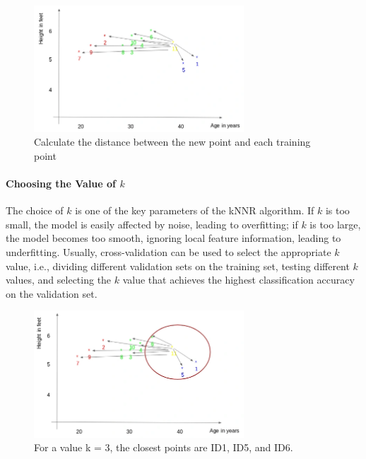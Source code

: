 \documentclass{article}
\begin{document}
\begin{figure}[H]
    \centering
    \includegraphics[width=0.7\textwidth]{Img/Screenshot-from-2018-08-22-12-49-33.png}
    \caption{Calculate the distance between the new point and each training point}
\end{figure}

\paragraph{Choosing the Value of \( k \)}
The choice of \( k \) is one of the key parameters of the kNNR algorithm. If \( k \) is too small, the model is easily affected by noise, leading to overfitting; if \( k \) is too large, the model becomes too smooth, ignoring local feature information, leading to underfitting. Usually, cross-validation can be used to select the appropriate \( k \) value, i.e., dividing different validation sets on the training set, testing different \( k \) values, and selecting the \( k \) value that achieves the highest classification accuracy on the validation set.

\begin{figure}[H]
    \centering
    \includegraphics[width=0.7\textwidth]{Img/Screenshot-from-2018-08-22-12-50-04.png}
    \caption{For a value k = 3, the closest points are ID1, ID5, and ID6.}
\end{figure}
\end{document}
